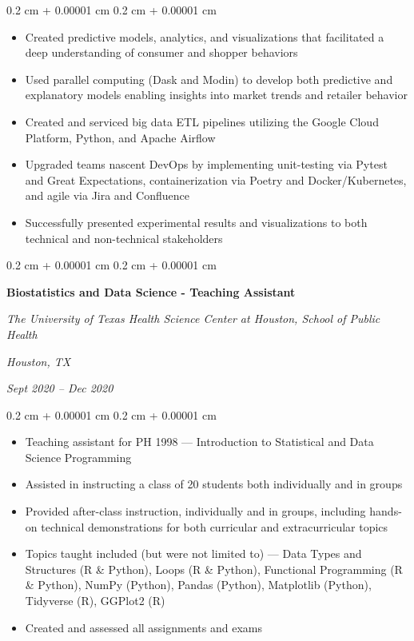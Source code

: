 \documentclass[10pt, letterpaper]{article}
\newenvironment{highlights}{
    \begin{itemize}[
        topsep=0.10 cm,
        parsep=0.10 cm,
        partopsep=0pt,
        itemsep=0pt,
        leftmargin=0.4 cm + 10pt
    ]
}{
    \end{itemize}
} %
\newenvironment{onecolentry}{
    \begin{adjustwidth}{
        0.2 cm + 0.00001 cm
    }{
        0.2 cm + 0.00001 cm
    }
}{
    \end{adjustwidth}
} %
\newenvironment{twocolentry}[2][]{
    \onecolentry
    \def\secondColumn{#2}
    \setcolumnwidth{\fill, 4.5 cm}
    \begin{paracol}{2}
}{
    \switchcolumn \raggedleft \secondColumn
    \end{paracol}
    \endonecolentry
} %
\begin{document}
        \vspace{0.10 cm}
        \begin{onecolentry}
            \begin{highlights}
                \item Created predictive models, analytics, and visualizations that facilitated a deep understanding of consumer and shopper behaviors
                \item Used parallel computing (Dask and Modin) to develop both predictive and explanatory models enabling insights into market trends and retailer behavior
                \item Created and serviced big data ETL pipelines utilizing the Google Cloud Platform, Python, and Apache Airflow
                \item Upgraded teams nascent DevOps by implementing unit-testing via Pytest and Great Expectations, containerization via Poetry and Docker/Kubernetes, and agile via Jira and Confluence
                \item Successfully presented experimental results and visualizations to both technical and non-technical stakeholders
            \end{highlights}
        \end{onecolentry}


        \vspace{0.2 cm}

        \begin{twocolentry}{
        \textit{Houston, TX}    
            
        \textit{Sept 2020 – Dec 2020}}
            \textbf{Biostatistics and Data Science - Teaching Assistant}
            
            \textit{The University of Texas Health Science Center at Houston, School of Public Health}
        \end{twocolentry}

        \vspace{0.10 cm}
        \begin{onecolentry}
            \begin{highlights}
                \item Teaching assistant for PH 1998 — Introduction to Statistical and Data Science Programming
                \item Assisted in instructing a class of 20 students both individually and in groups
                \item Provided after-class instruction, individually and in groups, including hands-on technical demonstrations for both curricular and extracurricular topics
                \item Topics taught included (but were not limited to) — Data Types and Structures (R \& Python), Loops (R \& Python), Functional Programming (R \& Python), NumPy (Python), Pandas (Python), Matplotlib (Python), Tidyverse (R), GGPlot2 (R)
                \item Created and assessed all assignments and exams
            \end{highlights}
        \end{onecolentry}
\end{document}
